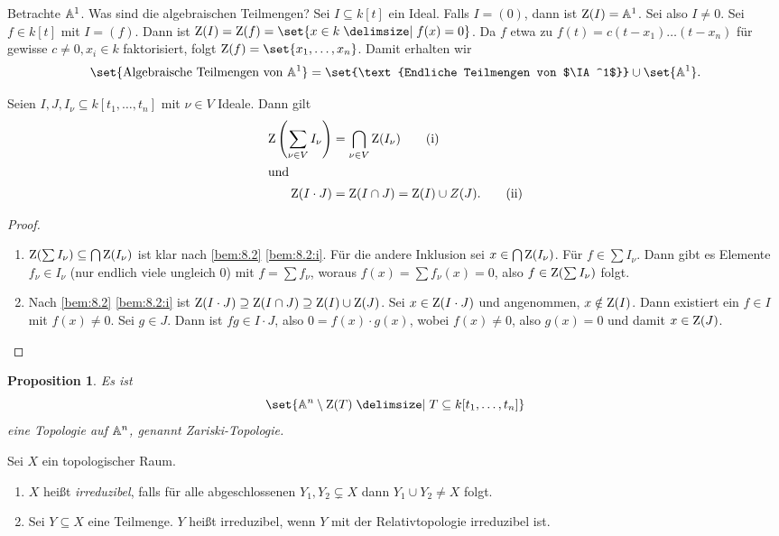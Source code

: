 \documentclass[12pt,a4paper]{scrartcl}
\theoremstyle{cplain}
\newtheorem{prop}[thmcounter]{Proposition}
\theoremstyle{cdef}
\begin{document}
\begin{bsp} 
	Betrachte $\mathbb A^1$. Was sind die algebraischen Teilmengen? Sei $I\subseteq k[t]$ ein Ideal. Falls $I = (0)$, dann ist $\operatorname{Z}(I) = \mathbb A^1$. Sei also $I\neq 0$. Sei $f\in k[t]$ mit $I = (f)$. Dann ist $\Z(I) = \Z(f) = \set{x\in k\given f(x) = 0}$. Da $f$ etwa zu $f(t) = c(t-x_1)\dots (t-x_n)$ für gewisse $c \neq 0, x_i\in k$ faktorisiert, folgt $\Z(f) = \set{x_1,\dots, x_n}$. Damit erhalten wir
	\[\set{\text{Algebraische Teilmengen von }\IA^1} = \set{\text{Endliche Teilmengen von $\IA^1$}}\cup \set{\IA^1}.\]
\end{bsp}
\begin{lem} \label{lem:8.5}
	Seien $I,J, I_{\nu}\subseteq k[t_1,\dots, t_n]$ mit $\nu\in V$ Ideale. Dann gilt
	\begin{align*}
		\operatorname{Z}\left(\sum_{\nu\in V} I_{\nu}\right) &= \bigcap_{\nu\in V} \operatorname{Z}(I_{\nu}) \tag{i}\label{lem:8.5:i} \\\intertext{und}
		\operatorname{Z}(I\cdot J) &= \operatorname{Z}(I\cap J) = \operatorname{Z}(I)\cup Z(J). \tag{ii}\label{lem:8.5:ii}
	\end{align*}
\end{lem}
\begin{proof}
	\leavevmode
	\begin{enumerate}[label=\eqref{lem:8.5:\roman*}]
		\item $\operatorname{Z}(\sum I_{\nu}) \subseteq \bigcap \operatorname{Z}(I_{\nu})$ ist klar nach \cref{bem:8.2} \ref{bem:8.2:i}. Für die andere Inklusion sei $x\in\bigcap \operatorname{Z}(I_{\nu})$. Für $f\in\sum I_{\nu}$. Dann gibt es Elemente $f_{\nu}\in I_{\nu}$ (nur endlich viele ungleich $0$) mit $f = \sum f_{\nu}$, woraus $f(x) = \sum f_{\nu}(x) = 0$, also $f\in \operatorname{Z}(\sum I_{\nu})$ folgt.
		\item Nach \cref{bem:8.2} \ref{bem:8.2:i} ist $\operatorname{Z}(I\cdot J) \supseteq \operatorname{Z}(I\cap J)\supseteq \operatorname{Z}(I)\cup \operatorname{Z}(J)$. Sei $x\in \operatorname{Z}(I\cdot J)$ und angenommen, $x\notin \operatorname{Z}(I)$. Dann existiert ein $f\in I$ mit $f(x) \neq 0$. Sei $g\in J$. Dann ist $fg\in I\cdot J$, also $0 = f(x)\cdot g(x)$, wobei $f(x)\neq 0$, also $g(x) = 0$ und damit $x \in \operatorname{Z}(J)$.
		\qedhere
	\end{enumerate}
\end{proof}
\begin{prop} Es ist
	\[\set{\IA^n\setminus \Z(T)\given T\subseteq k[t_1,\dots, t_n]}\]
	eine Topologie auf $\mathbb A^n$, genannt \emph{Zariski-Topologie}.
\end{prop}
\begin{defi}
	Sei $X$ ein topologischer Raum.
	\begin{enumerate}
		\item $X$ heißt \emph{irreduzibel}, falls für alle abgeschlossenen $Y_1, Y_2\subsetneq X$ dann $Y_1\cup Y_2 \neq X$ folgt.
		\item Sei $Y\subseteq X$ eine Teilmenge. $Y$ heißt irreduzibel, wenn $Y$ mit der Relativtopologie irreduzibel ist. 
	\end{enumerate}
\end{defi}
\end{document}
